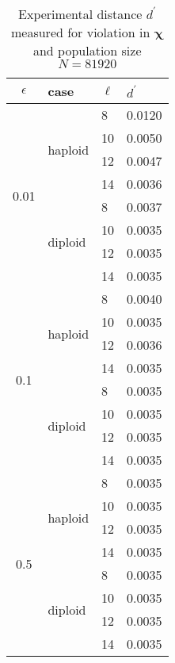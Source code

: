 \begin{table}[ht]
\caption{Experimental distance $d^\prime$ measured for violation in $\bm{\chi}$ and population size $N = 81920$ }
\centering
\begin{tabularx}{0.75\textwidth}{ c *{3}{X}}
\toprule
$\epsilon$ & case & $\ell$ & $d^\prime$ \\
\midrule
\multirow{8}{*}{0.01} & \multirow{4}{*}{haploid} 	& 8 & 0.0120 \\
		      &   				& 10 & 0.0050 \\ 
		      & 			 	& 12 & 0.0047 \\
		      &  	 			& 14 & 0.0036 \\ 
		      \cmidrule(l){2-4}
		      & \multirow{4}{*}{diploid} 	& 8 & 0.0037 \\
		      &  	 			& 10 & 0.0035 \\
		      & 			 	& 12 & 0.0035 \\
		      &  	 			& 14 & 0.0035 \\
		      \midrule
\multirow{8}{*}{0.1} & \multirow{4}{*}{haploid} 	& 8 & 0.0040 \\
		      &   				& 10 & 0.0035 \\	
		      & 				& 12 & 0.0036 \\	
		      &  	 			& 14 & 0.0035 \\
		      \cmidrule(l){2-4}
		      & \multirow{4}{*}{diploid} 	& 8 & 0.0035 \\
		      &  	 			& 10 & 0.0035 \\
		      & 				& 12 & 0.0035 \\
		      &  	 			& 14 & 0.0035 \\
		      \midrule
\multirow{8}{*}{0.5} & \multirow{4}{*}{haploid} 	& 8 & 0.0035 \\
		      &   				& 10 & 0.0035 \\
		      & 				& 12 & 0.0035 \\
		      &  	 			& 14 & 0.0035 \\
		      \cmidrule(l){2-4}
		      & \multirow{4}{*}{diploid} 	& 8 & 0.0035 \\	
		      &  	 			& 10 & 0.0035 \\
		      &  				& 12 & 0.0035 \\
		      &  	 			& 14 & 0.0035 \\
\bottomrule
\end{tabularx}
\label{ditanceChi81920}
\end{table}  
